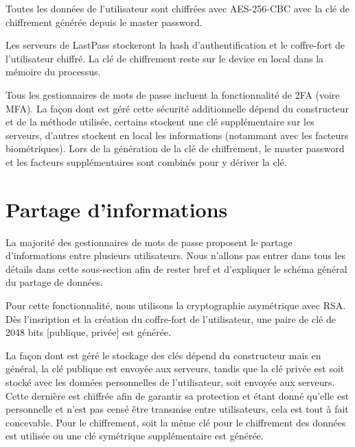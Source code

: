 Toutes les données de l'utilisateur sont chiffrées avec AES-256-CBC avec la clé de chiffrement générée depuis le master password.

Les serveurs de LastPass stockeront la hash d'authentification et le coffre-fort de l'utilisateur chiffré. La clé de chiffrement reste sur le device en local dans la mémoire du processus.

Tous les gestionnaires de mots de passe incluent la fonctionnalité de 2FA (voire MFA). La façon dont est géré cette sécurité additionnelle dépend du constructeur et de la méthode utilisée, certains stockent une clé supplémentaire sur les serveurs, d'autres stockent en local les informations (notammant avec les facteurs biométriques). Lors de la génération de la clé de chiffrement, le master password et les facteurs supplémentaires sont combinés pour y dériver la clé.
\section{Partage d'informations}
La majorité des gestionnaires de mots de passe proposent le partage d'informations entre plusieurs utilisateurs. Nous n'allons pas entrer dans tous les détails dans cette sous-section afin de rester bref et d'expliquer le schéma général du partage de données.

Pour cette fonctionnalité, nous utilisons la cryptographie asymétrique avec RSA. Dès l'insription et la création du coffre-fort de l'utilisateur, une paire de clé de 2048 bits [publique, privée] est générée. 

La façon dont est géré le stockage des clés dépend du constructeur mais en général, la clé publique est envoyée aux serveurs, tandis que la clé privée est soit stocké avec les données personnelles de l'utilisateur, soit envoyée aux serveurs. Cette dernière est chiffrée afin de garantir sa protection et étant donné qu'elle est personnelle et n'est pas censé être transmise entre utilisateurs, cela est tout à fait concevable. Pour le chiffrement, soit la même clé pour le chiffrement des données est utilisée ou une clé symétrique supplémentaire est générée. 

